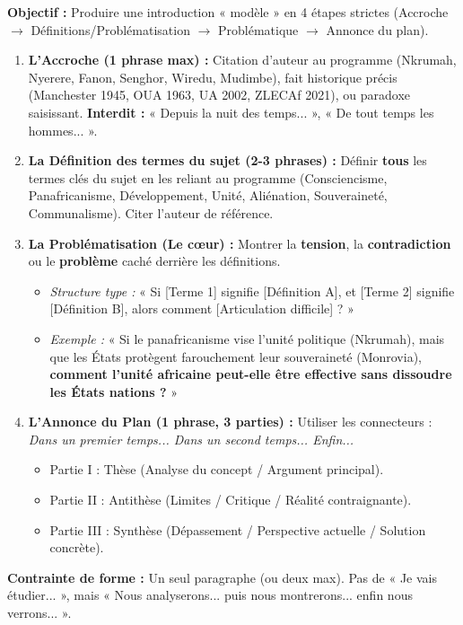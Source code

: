 \documentclass[11pt]{article}
\begin{document}
\begin{methode}
\textbf{Objectif :} Produire une introduction « modèle » en 4 étapes strictes (Accroche $\rightarrow$ Définitions/Problématisation $\rightarrow$ Problématique $\rightarrow$ Annonce du plan).
\begin{enumerate}
    \item \textbf{L'Accroche (1 phrase max) :} Citation d'auteur au programme (Nkrumah, Nyerere, Fanon, Senghor, Wiredu, Mudimbe), fait historique précis (Manchester 1945, OUA 1963, UA 2002, ZLECAf 2021), ou paradoxe saisissant. \textbf{Interdit :} « Depuis la nuit des temps... », « De tout temps les hommes... ».
    \item \textbf{La Définition des termes du sujet (2-3 phrases) :} Définir \textbf{tous} les termes clés du sujet en les reliant au programme (Consciencisme, Panafricanisme, Développement, Unité, Aliénation, Souveraineté, Communalisme). Citer l'auteur de référence.
    \item \textbf{La Problématisation (Le cœur) :} Montrer la \textbf{tension}, la \textbf{contradiction} ou le \textbf{problème} caché derrière les définitions.
        \begin{itemize}
            \item \emph{Structure type :} « Si [Terme 1] signifie [Définition A], et [Terme 2] signifie [Définition B], alors comment [Articulation difficile] ? »
            \item \emph{Exemple :} « Si le panafricanisme vise l'unité politique (Nkrumah), mais que les États protègent farouchement leur souveraineté (Monrovia), \textbf{comment l'unité africaine peut-elle être effective sans dissoudre les États nations ?} »
        \end{itemize}
    \item \textbf{L'Annonce du Plan (1 phrase, 3 parties) :} Utiliser les connecteurs : \emph{Dans un premier temps... Dans un second temps... Enfin...}
        \begin{itemize}
            \item Partie I : Thèse (Analyse du concept / Argument principal).
            \item Partie II : Antithèse (Limites / Critique / Réalité contraignante).
            \item Partie III : Synthèse (Dépassement / Perspective actuelle / Solution concrète).
        \end{itemize}
\end{enumerate}
\textbf{Contrainte de forme :} Un seul paragraphe (ou deux max). Pas de « Je vais étudier... », mais « Nous analyserons... puis nous montrerons... enfin nous verrons... ».
\end{methode}
\end{document}
